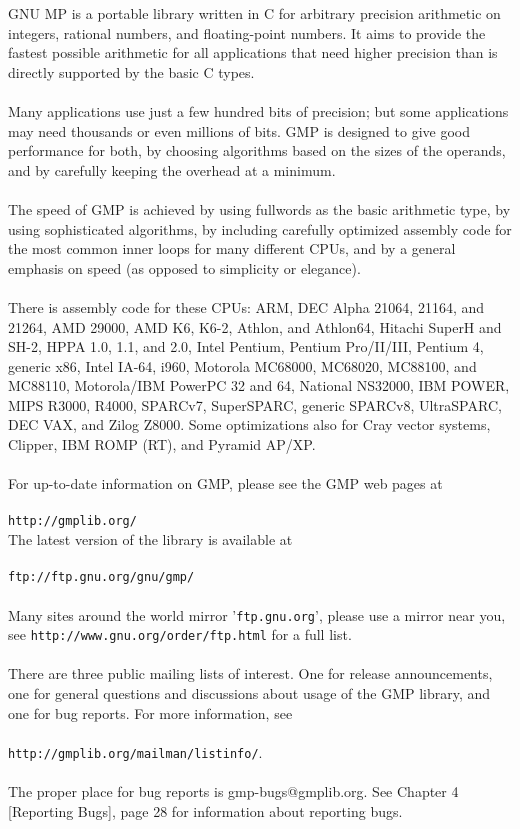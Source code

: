 \documentclass[pdftex,10pt]{article}
\begin{document}
GNU MP is a portable library written in C for arbitrary precision arithmetic on
integers, rational numbers, and floating-point numbers. It aims to provide the
fastest possible arithmetic for all applications that need higher precision
than is directly supported by the basic C types.\\
\\
Many applications use just a few hundred bits of precision; but some
applications may need thousands or even millions of bits. GMP is designed to
give good performance for both, by choosing algorithms based on the sizes of
the operands, and by carefully keeping the overhead at a minimum.\\
\\
The speed of GMP is achieved by using fullwords as the basic arithmetic type,
by using sophisticated algorithms, by including carefully optimized assembly
code for the most common inner loops for many different CPUs, and by a general
emphasis on speed (as opposed to simplicity or elegance).\\
\\
There is assembly code for these CPUs: ARM, DEC Alpha 21064, 21164, and 21264,
AMD 29000, AMD K6, K6-2, Athlon, and Athlon64, Hitachi SuperH and SH-2, HPPA
1.0, 1.1, and 2.0, Intel Pentium, Pentium Pro/II/III, Pentium 4, generic x86,
Intel IA-64, i960, Motorola MC68000, MC68020, MC88100, and MC88110,
Motorola/IBM PowerPC 32 and 64, National NS32000, IBM POWER, MIPS R3000, R4000,
SPARCv7, SuperSPARC, generic SPARCv8, UltraSPARC, DEC VAX, and Zilog Z8000.
Some optimizations also for Cray vector systems, Clipper, IBM ROMP (RT), and
Pyramid AP/XP.\\
\\
For up-to-date information on GMP, please see the GMP web pages at\\
\\
\texttt{http://gmplib.org/}\\

The latest version of the library is available at\\
\\
\texttt{ftp://ftp.gnu.org/gnu/gmp/}\\
\\
Many sites around the world mirror '\texttt{ftp.gnu.org}', please use a mirror
near you, see \texttt{http://www.gnu.org/order/ftp.html} for a full list.\\
\\
There are three public mailing lists of interest. One for release
announcements, one for general questions and discussions about usage of the GMP
library, and one for bug reports. For more information, see\\
\\
\texttt{http://gmplib.org/mailman/listinfo/}.\\
\\
The proper place for bug reports is gmp-bugs@gmplib.org. See Chapter 4
[Reporting Bugs], page 28 for information about reporting bugs.
\end{document}
